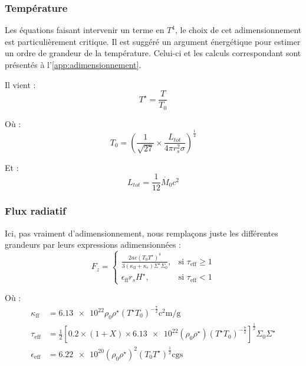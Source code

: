 \subsubsection{Température}

Les équations faisant intervenir un terme en $T^4$, le choix de cet
adimensionnement est particulièrement critique. Il est suggéré un argument
énergétique pour estimer un ordre de grandeur de la température. Celui-ci et
les calculs correspondant sont présentés à l’\cref{app:adimensionnement}. 

Il vient :
\begin{equation}
    T^{\star} = \frac{T}{T_0}
\end{equation}

Où :
\begin{equation}
    T_0 = \left(\frac{1}{\sqrt{27}} \times \frac{L_{tot}}{4 \pi r_s^2 \sigma} \right)^\frac{1}{4}
\end{equation}

Et :
\begin{equation}
    L_{tot} = \frac{1}{12} \dot{M_0} c^2
\end{equation}

\subsubsection{Flux radiatif}

Ici, pas vraiment d’adimensionnement, nous remplaçons juste les différentes
grandeurs par leurs expressions adimensionnées :
\begin{equation}
    F_z =
    \begin{cases}
        \frac{2 a c \left(T_0 T^\star\right)^4}{3 (\kappa_\mathrm{ff} + \kappa_e)\Sigma^\star \Sigma_0}, &\text{si $\tau_\mathrm{eff} \geq 1$} \\
        \epsilon_\mathrm{ff} r_s H^\star, &\text{si $\tau_\mathrm{eff} < 1$}
    \end{cases}
\end{equation}

Où :
\begin{align}
    \kappa_\mathrm{ff} &= \num{6.13e22} \rho_0 \rho^\star \left(T^\star T_0\right)^{-\frac{7}{2}} \si{\square\centi\meter\per\gram} \\
    \tau_\mathrm{eff} &= \frac{1}{2} \left[ 0.2 \times (1 + X) \times \num{6.13e22} \left(\rho_0 \rho^\star\right) \left(T^\star T_0\right)^{-\frac{7}{2}} \right]^\frac{1}{2} \Sigma_0 \Sigma^\star \\
    \epsilon_\mathrm{eff} &= \num{6.22e20} (\rho_0 \rho^\star)^2 (T_0 T^\star)^\frac{1}{2} \text{cgs}
\end{align}

